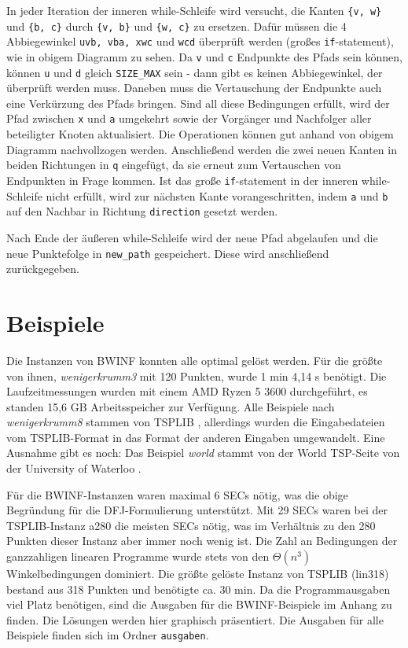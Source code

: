 \documentclass[a4paper, 10pt, ngerman]{article}
\begin{document}
\medskip

In jeder Iteration der inneren while-Schleife wird versucht, die Kanten \verb|{v, w}| und \verb|{b, c}| durch \verb|{v, b}| und \verb|{w, c}| zu ersetzen. Dafür müssen die 4 Abbiegewinkel \verb|uvb, vba, xwc| und \verb|wcd| überprüft werden (großes \verb|if|-statement), wie in obigem Diagramm zu sehen. Da \verb|v| und \verb|c| Endpunkte des Pfads sein können, können \verb|u| und \verb|d| gleich \verb|SIZE_MAX| sein - dann gibt es keinen Abbiegewinkel, der überprüft werden muss. Daneben muss die Vertauschung der Endpunkte auch eine Verkürzung des Pfads bringen. Sind all diese Bedingungen erfüllt, wird der Pfad zwischen \verb|x| und \verb|a| umgekehrt sowie der Vorgänger und Nachfolger aller beteiligter Knoten aktualisiert. Die Operationen können gut anhand von obigem Diagramm nachvollzogen werden. Anschließend werden die zwei neuen Kanten in beiden Richtungen in \verb|q| eingefügt, da sie erneut zum Vertauschen von Endpunkten in Frage kommen. Ist das große \verb|if|-statement in der inneren while-Schleife nicht erfüllt, wird zur nächsten Kante vorangeschritten, indem \verb|a| und \verb|b| auf den Nachbar in Richtung \verb|direction| gesetzt werden.

Nach Ende der äußeren while-Schleife wird der neue Pfad abgelaufen und die neue Punktefolge in \verb|new_path| gespeichert. Diese wird anschließend zurückgegeben.

\section{Beispiele}

Die Instanzen von BWINF konnten alle optimal gelöst werden. Für die größte von ihnen, \emph{wenigerkrumm3} mit 120 Punkten, wurde 1 min 4,14 s benötigt. Die Laufzeitmessungen wurden mit einem AMD Ryzen 5 3600 durchgeführt, es standen 15,6 GB Arbeitsspeicher zur Verfügung. Alle Beispiele nach \emph{wenigerkrumm8} stammen von TSPLIB \cite{tsplib}, allerdings wurden die Eingabedateien vom TSPLIB-Format in das Format der anderen Eingaben umgewandelt. Eine Ausnahme gibt es noch: Das Beispiel \emph{world} stammt von der World TSP-Seite von der University of Waterloo \cite{uwaterloo}. 

Für die BWINF-Instanzen waren maximal 6 SECs nötig, was die obige Begründung für die DFJ-Formulierung unterstützt. Mit 29 SECs waren bei der TSPLIB-Instanz a280 die meisten SECs nötig, was im Verhältnis zu den 280 Punkten dieser Instanz aber immer noch wenig ist. Die Zahl an Bedingungen der ganzzahligen linearen Programme wurde stets von den $\Theta(n^3)$ Winkelbedingungen dominiert. Die größte gelöste Instanz von TSPLIB (lin318) bestand aus 318 Punkten und benötigte ca. 30 min. Da die Programmausgaben viel Platz benötigen, sind die Ausgaben für die BWINF-Beispiele im Anhang zu finden. Die Lösungen werden hier graphisch präsentiert. Die Ausgaben für alle Beispiele finden sich im Ordner \verb|ausgaben|. 
\end{document}
